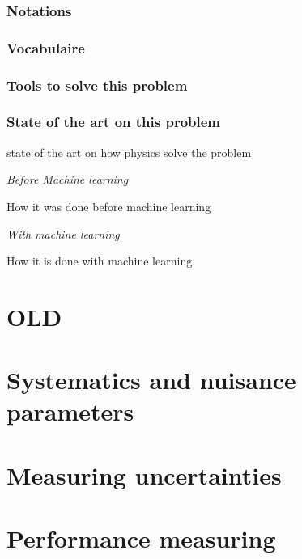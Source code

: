 \subsubsection{Notations} %
\label{sub:notations}

\subsubsection{Vocabulaire} %
\label{sub:vocabulaire}

\subsubsection{Tools to solve this problem} %
\label{sub:tools_to_solve_this_problem}


\subsubsection{State of the art on this problem} %
\label{sub:state_of_the_art_on_this_problem}


state of the art on how physics solve the problem


\emph{Before Machine learning}

How it was done before machine learning

\emph{With machine learning}

How it is done with machine learning



\section{OLD} %

\section{Systematics and nuisance parameters} %
\label{sec:systematics_and_nuisance_parameters}

\section{Measuring uncertainties} %
\label{sec:measuring_uncertainties}

\section{ Performance measuring }
\label{sec:performance_measuring}

